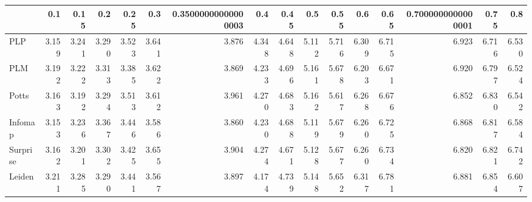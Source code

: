 \begin{tabular}{lrrrrrrrrrrrrrrr}
\toprule
{} &   0.1 &  0.15 &   0.2 &  0.25 &   0.3 & 0.35000000000000003 &   0.4 &  0.45 &   0.5 &  0.55 &   0.6 &  0.65 & 0.7000000000000001 &  0.75 &   0.8 \\
\midrule
PLP      & 3.159 & 3.241 & 3.290 & 3.523 & 3.641 &               3.876 & 4.348 & 4.648 & 5.112 & 5.716 & 6.309 & 6.715 &              6.923 & 6.716 & 6.530 \\
PLM      & 3.192 & 3.222 & 3.313 & 3.385 & 3.622 &               3.869 & 4.233 & 4.696 & 5.161 & 5.678 & 6.203 & 6.671 &              6.920 & 6.797 & 6.524 \\
Potts    & 3.163 & 3.192 & 3.294 & 3.513 & 3.612 &               3.961 & 4.270 & 4.683 & 5.162 & 5.617 & 6.268 & 6.676 &              6.852 & 6.830 & 6.542 \\
Infomap  & 3.153 & 3.236 & 3.367 & 3.446 & 3.586 &               3.860 & 4.230 & 4.688 & 5.119 & 5.679 & 6.260 & 6.725 &              6.868 & 6.817 & 6.584 \\
Surprise & 3.162 & 3.201 & 3.302 & 3.425 & 3.655 &               3.904 & 4.274 & 4.671 & 5.128 & 5.677 & 6.260 & 6.734 &              6.820 & 6.821 & 6.742 \\
Leiden   & 3.211 & 3.285 & 3.290 & 3.441 & 3.567 &               3.897 & 4.174 & 4.739 & 5.148 & 5.652 & 6.317 & 6.781 &              6.881 & 6.854 & 6.607 \\
\bottomrule
\end{tabular}

